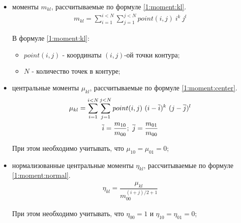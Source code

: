 \begin{itemize}

	\item моменты $m_{kl}$, рассчитываемые по формуле \eqref{1:moment:kl}.
	\begin{gather}
		m_{kl} = \sum_{i = 1}^{i < N} \sum_{j = 1}^{j < N} point(i, j) ~ i^k ~ j^l \label{1:moment:kl}
	\end{gather}

	В формуле \eqref{1:moment:kl}:

	\begin{itemize}

		\item $point(i, j)$ - координаты $(i, j)$-ой точки контура;
		\item $N$ - количество точек в контуре;

	\end{itemize}

	\item центральные моменты $\mu_{kl}$, рассчитываемые по формуле \eqref{1:moment:center}.
	\begin{gather}
		\mu_{kl} = \sum_{i = 1}^{i < N} \sum_{j = 1}^{j < N} point(i, j) ~ (i - \overline{i})^k ~ (j - \overline{j})^l \label{1:moment:center} \\
		\overline{i} = \dfrac{m_{10}}{m_{00}} ;~ \overline{j} = \dfrac{m_{01}}{m_{00}} \notag
	\end{gather}

	При этом необходимо учитывать, что $\mu_{10} = \mu_{01} = 0$;

	\item нормализованные центральные моменты $\eta_{kl}$, рассчитываемые по формуле \eqref{1:moment:normal}.
	\begin{gather}
		\eta_{kl} = \dfrac{\mu_{kl}}{m_{00}^{(i + j) / 2 + 1}} \label{1:moment:normal}
	\end{gather}

	При этом необходимо учитывать, что $\eta_{00} = 1$ и $\eta_{10} = \eta_{01} = 0$;


\end{itemize}

